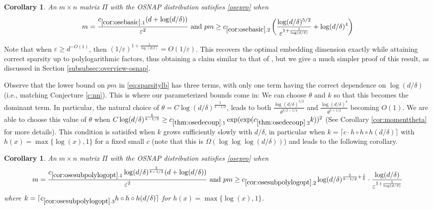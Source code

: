 \documentclass[11pt]{amsart}
\numberwithin{equation}{section}
\numberwithin{equation}{section}
\newtheorem{corollary}[theorem]{Corollary}
\begin{document}
\begin{corollary}\label{cor:osebasic}
    An $m \times n$ matrix $\Pi$ with the OSNAP distribution satisfies \eqref{osepro} when 
    \[ m=\frac{c_{\ref{cor:osebasic}.1}(d+\log(d/\delta))}{\varepsilon^2} \text{ and } 
    pm \ge c_{\ref{cor:osebasic}.2}\left(\frac{\log(d/\delta)^{5/2}}{\varepsilon^{1+\frac{1}{\log(d/\delta)}}}+\log(d/\delta)^4\right)
    \]
\end{corollary}

Note that when $\varepsilon \geq d^{-O(1)}$, then $(1/\varepsilon)^{1+\frac1{\log(d/\delta)}} = O(1/\varepsilon)$.
This recovers the optimal embedding dimension exactly while attaining correct sparsity up to polylogarithmic factors, thus obtaining a claim similar to that of \cite[Theorem 7]{chenakkod2025optimal}, but we give a much simpler proof of this result, as discussed in Section \ref{subsubsec:overview-osnap}.

Observe that the lower bound on $pm$ in \eqref{eq:sparsitylb} has three terms, with only one term having the correct dependence on $\log(d/\delta)$ (i.e., matching Conjecture \ref{c:nn}). This is where our parameterized bounds come in: We can choose $\theta$ and $k$ so that this becomes the dominant term. In particular, the natural choice of $\theta = C \log(d/\delta)^\frac{5}{k - 1/2}$, leads to both $\frac{\log(d/\delta)^{5/2}}{\theta ^{k/2-1/4}}$ and $\frac{ \log(d/\delta)^{4}}{\theta ^{k+1/2}}$ becoming $O(1)$. We are able to choose this value of $\theta$ when $C \log(d/\delta)^\frac{5}{k - 1/2} \ge  c_{\ref{thm:osedecoup}.1} \exp(\exp(c_{\ref{thm:osedecoup}.2}k))^2$ (See Corollary \ref{cor:momenttheta} for more details). This condition is satisifed when $k$ grows sufficiently slowly with $d/\delta$, in particular when $k= \lceil c \cdot h \circ h \circ h (d/\delta) \rceil $ with $h(x) = \max \{ \log(x) , 1 \}$ for a fixed small $c$ (note that this is $\Omega( \log \log \log(d/\delta))$)  and leads to the following corollary.

\begin{corollary}\label{cor:osesubpolylogopt}
    An $m \times n$ matrix $\Pi$ with the OSNAP distribution satisfies \eqref{osepro} when 
    \[ m=\frac{c_{\ref{cor:osesubpolylogopt}.1}\log(d/\delta)^\frac{5}{k - 1/2}(d+\log(d/\delta))}{\varepsilon^2} \text{ and } 
    pm \ge c_{\ref{cor:osesubpolylogopt}.2}\log(d/\delta)^{\frac{5}{k - 1/2} + \frac{1}{k}} \cdot \frac{\log(d/\delta)}{\varepsilon^{1+\frac{1}{\log(d/\delta)}}}
    \]
    where $ k= \lceil c_{\ref{cor:osesubpolylogopt}.3}  h \circ h \circ h (d/\delta)  \rceil $ for $h(x) = \max \{ \log(x) , 1 \}$.
\end{corollary}
\end{document}
